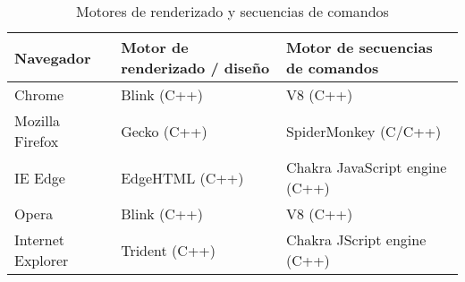 \begin{table}[H]
  \renewcommand{\arraystretch}{1.5}
  \centering
  \scriptsize
  \begin{tabular}{ |p{2cm}||p{5cm}|p{5cm}|  }
    \hline
        Navegador
      & Motor de renderizado / diseño
      & Motor de secuencias de comandos \\
    \hline
        Chrome
      & Blink (C++)
      & V8 (C++) \\
    \hline
    \hline
        Mozilla Firefox
      & Gecko (C++)
      & SpiderMonkey (C/C++) \\
    \hline
    \hline
        IE Edge
      & EdgeHTML (C++)
      & Chakra JavaScript engine (C++) \\
    \hline
    \hline
    Opera
      & Blink (C++)
      & V8 (C++) \\
    \hline
    Internet Explorer
      & Trident (C++)
      & Chakra JScript engine (C++) \\
    \hline
  \end{tabular}
  \caption{Motores de renderizado y secuencias de comandos}
\end{table}
\vspace{0.8cm}
